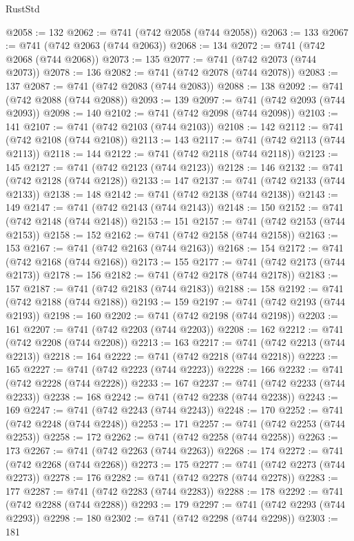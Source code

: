 \begin{lexlean}{RustStd}
\begin{coremodule}
{\begin{coremodule}
{{{{{{{{{{{{{{{{{{{{{{{{{{{{{{{{{{{{{{{{{{{{{@2058 := 132
@2062 := @741 (@742 @2058 (@744 @2058))
@2063 := 133
@2067 := @741 (@742 @2063 (@744 @2063))
@2068 := 134
@2072 := @741 (@742 @2068 (@744 @2068))
@2073 := 135
@2077 := @741 (@742 @2073 (@744 @2073))
@2078 := 136
@2082 := @741 (@742 @2078 (@744 @2078))
@2083 := 137
@2087 := @741 (@742 @2083 (@744 @2083))
@2088 := 138
@2092 := @741 (@742 @2088 (@744 @2088))
@2093 := 139
@2097 := @741 (@742 @2093 (@744 @2093))
@2098 := 140
@2102 := @741 (@742 @2098 (@744 @2098))
@2103 := 141
@2107 := @741 (@742 @2103 (@744 @2103))
@2108 := 142
@2112 := @741 (@742 @2108 (@744 @2108))
@2113 := 143
@2117 := @741 (@742 @2113 (@744 @2113))
@2118 := 144
@2122 := @741 (@742 @2118 (@744 @2118))
@2123 := 145
@2127 := @741 (@742 @2123 (@744 @2123))
@2128 := 146
@2132 := @741 (@742 @2128 (@744 @2128))
@2133 := 147
@2137 := @741 (@742 @2133 (@744 @2133))
@2138 := 148
@2142 := @741 (@742 @2138 (@744 @2138))
@2143 := 149
@2147 := @741 (@742 @2143 (@744 @2143))
@2148 := 150
@2152 := @741 (@742 @2148 (@744 @2148))
@2153 := 151
@2157 := @741 (@742 @2153 (@744 @2153))
@2158 := 152
@2162 := @741 (@742 @2158 (@744 @2158))
@2163 := 153
@2167 := @741 (@742 @2163 (@744 @2163))
@2168 := 154
@2172 := @741 (@742 @2168 (@744 @2168))
@2173 := 155
@2177 := @741 (@742 @2173 (@744 @2173))
@2178 := 156
@2182 := @741 (@742 @2178 (@744 @2178))
@2183 := 157
@2187 := @741 (@742 @2183 (@744 @2183))
@2188 := 158
@2192 := @741 (@742 @2188 (@744 @2188))
@2193 := 159
@2197 := @741 (@742 @2193 (@744 @2193))
@2198 := 160
@2202 := @741 (@742 @2198 (@744 @2198))
@2203 := 161
@2207 := @741 (@742 @2203 (@744 @2203))
@2208 := 162
@2212 := @741 (@742 @2208 (@744 @2208))
@2213 := 163
@2217 := @741 (@742 @2213 (@744 @2213))
@2218 := 164
@2222 := @741 (@742 @2218 (@744 @2218))
@2223 := 165
@2227 := @741 (@742 @2223 (@744 @2223))
@2228 := 166
@2232 := @741 (@742 @2228 (@744 @2228))
@2233 := 167
@2237 := @741 (@742 @2233 (@744 @2233))
@2238 := 168
@2242 := @741 (@742 @2238 (@744 @2238))
@2243 := 169
@2247 := @741 (@742 @2243 (@744 @2243))
@2248 := 170
@2252 := @741 (@742 @2248 (@744 @2248))
@2253 := 171
@2257 := @741 (@742 @2253 (@744 @2253))
@2258 := 172
@2262 := @741 (@742 @2258 (@744 @2258))
@2263 := 173
@2267 := @741 (@742 @2263 (@744 @2263))
@2268 := 174
@2272 := @741 (@742 @2268 (@744 @2268))
@2273 := 175
@2277 := @741 (@742 @2273 (@744 @2273))
@2278 := 176
@2282 := @741 (@742 @2278 (@744 @2278))
@2283 := 177
@2287 := @741 (@742 @2283 (@744 @2283))
@2288 := 178
@2292 := @741 (@742 @2288 (@744 @2288))
@2293 := 179
@2297 := @741 (@742 @2293 (@744 @2293))
@2298 := 180
@2302 := @741 (@742 @2298 (@744 @2298))
@2303 := 181
}}}}}}}}}}}}}}}}}}}}}}}}}}}}}}}}}}}}}}}}}}}}}
\end{coremodule}}
\end{coremodule}
\end{lexlean}
